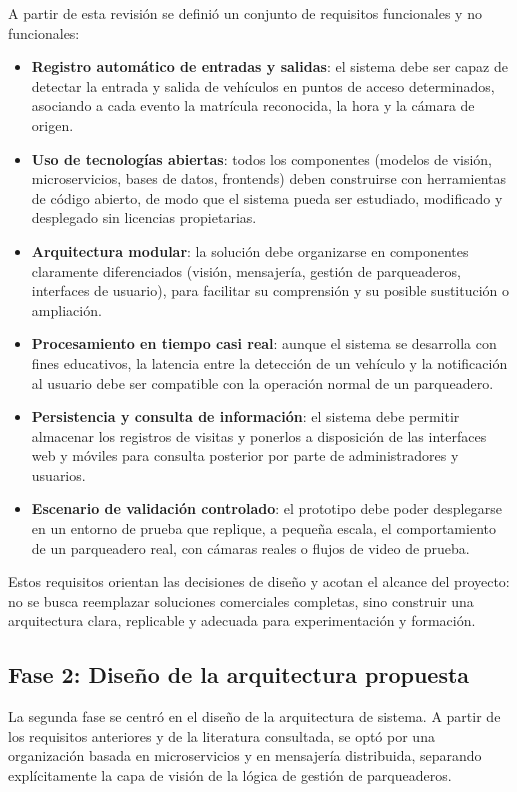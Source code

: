 A partir de esta revisión se definió un conjunto de requisitos funcionales y no funcionales:

\begin{itemize}
    \item \textbf{Registro automático de entradas y salidas}: el sistema debe ser capaz de detectar la entrada y salida de vehículos en puntos de acceso determinados, asociando a cada evento la matrícula reconocida, la hora y la cámara de origen.
    \item \textbf{Uso de tecnologías abiertas}: todos los componentes (modelos de visión, microservicios, bases de datos, frontends) deben construirse con herramientas de código abierto, de modo que el sistema pueda ser estudiado, modificado y desplegado sin licencias propietarias.
    \item \textbf{Arquitectura modular}: la solución debe organizarse en componentes claramente diferenciados (visión, mensajería, gestión de parqueaderos, interfaces de usuario), para facilitar su comprensión y su posible sustitución o ampliación.
    \item \textbf{Procesamiento en tiempo casi real}: aunque el sistema se desarrolla con fines educativos, la latencia entre la detección de un vehículo y la notificación al usuario debe ser compatible con la operación normal de un parqueadero.
    \item \textbf{Persistencia y consulta de información}: el sistema debe permitir almacenar los registros de visitas y ponerlos a disposición de las interfaces web y móviles para consulta posterior por parte de administradores y usuarios.
    \item \textbf{Escenario de validación controlado}: el prototipo debe poder desplegarse en un entorno de prueba que replique, a pequeña escala, el comportamiento de un parqueadero real, con cámaras reales o flujos de video de prueba.
\end{itemize}

Estos requisitos orientan las decisiones de diseño y acotan el alcance del proyecto: no se busca reemplazar soluciones comerciales completas, sino construir una arquitectura clara, replicable y adecuada para experimentación y formación.

\subsection{Fase 2: Diseño de la arquitectura propuesta}

La segunda fase se centró en el diseño de la arquitectura de sistema. A partir de los requisitos anteriores y de la literatura consultada, se optó por una organización basada en microservicios y en mensajería distribuida, separando explícitamente la capa de visión de la lógica de gestión de parqueaderos.

